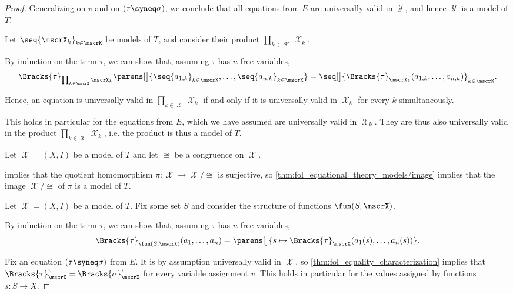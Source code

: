 \begin{proof}
  Generalizing on \( v \) and on \( (\tau \syneq \sigma) \), we conclude that all equations from \( E \) are universally valid in \( \mscrY \), and hence \( \mscrY \) is a model of \( T \).

   Let \( \seq{ \mscrX_k }_{k \in \mscrK} \) be models of \( T \), and consider their product \( \prod_{k \in \mscrK} \mscrX_k \).

  By induction on the term \( \tau \), we can show that, assuming \( \tau \) has \( n \) free variables,
  \begin{equation*}
    \Bracks{\tau}_{\prod_{k \in \mscrX} \mscrX_k}\parens[\big]{ \seq{ a_{1,k} }_{k \in \mscrK}, \ldots, \seq{ a_{n,k} }_{k \in \mscrK} } = \seq[\big]{\Bracks{\tau}_{\mscrX_k}(a_{1,k}, \ldots, a_{n,k}) }_{k \in \mscrK}.
  \end{equation*}

  Hence, an equation is universally valid in \( \prod_{k \in \mscrX} \mscrX_k \) if and only if it is universally valid in \( \mscrX_k \) for every \( k \) simultaneously.

  This holds in particular for the equations from \( E \), which we have assumed are universally valid in \( \mscrX_k \). They are thus also universally valid in the product \( \prod_{k \in \mscrX} \mscrX_k \), i.e. the product is thus a model of \( T \).

   Let \( \mscrX = (X, I) \) be a model of \( T \) and let \( {\cong} \) be a congruence on \( \mscrX \).

   implies that the quotient homomorphism \( \pi: \mscrX \to \mscrX / {\cong} \) is surjective, so \cref{thm:fol_equational_theory_models/image} implies that the image \( \mscrX / {\cong} \) of \( \pi \) is a model of \( T \).

   Let \( \mscrX = (X, I) \) be a model of \( T \). Fix some set \( S \) and consider the structure of functions \( \fun(S, \mscrX) \).

  By induction on the term \( \tau \), we can show that, assuming \( \tau \) has \( n \) free variables,
  \begin{equation*}
    \Bracks{\tau}_{\fun(S, \mscrX)}(a_1, \ldots, a_n) = \parens[\big]{ s \mapsto \Bracks{\tau}_\mscrX(a_1(s), \ldots, a_n(s)) }.
  \end{equation*}

  Fix an equation \( (\tau \syneq \sigma) \) from \( E \). It is by assumption universally valid in \( \mscrX \), so \cref{thm:fol_equality_characterization} implies that \( \Bracks{\tau}_\mscrX^v = \Bracks{\sigma}_\mscrX^v \) for every variable assignment \( v \). This holds in particular for the values assigned by functions \( s: S \to X \).


\end{proof}
